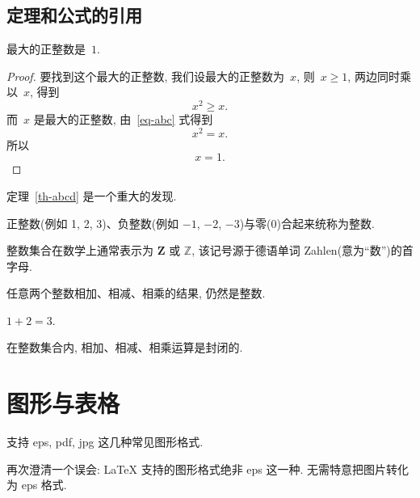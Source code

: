 \documentclass[forlib]{HDUMaster}   %
\begin{document}
\subsection{定理和公式的引用}

\begin{theorem}[谁发现的]\label{th-abcd}
最大的正整数是~$1$.
\end{theorem}

\begin{proof}
要找到这个最大的正整数, 我们设最大的正整数为~$x$, 则~$x \geqslant 1$, 两边同时乘以~$x$, 得到
\begin{equation}\label{eq-abc}
x^2 \geqslant x.
\end{equation}
而~$x$ 是最大的正整数, 由~\eqref{eq-abc} 式得到
\[
x^2 = x.
\]
所以
\begin{equation*}
x = 1.
\end{equation*}
\end{proof}

定理~\ref{th-abcd} 是一个重大的发现.

\begin{definition}[整数]
 正整数(例如 1, 2, 3)、负整数(例如 ${−1}$, $−2$, $−3$)与零(0)合起来统称为{\heiti 整数}.
\end{definition}

\begin{remark}
  整数集合在数学上通常表示为 $\mathbf{Z}$ 或 $\mathbb{Z}$, 该记号源于德语单词 Zahlen(意为``数'')的首字母.
\end{remark}

\begin{proposition}
任意两个整数相加、相减、相乘的结果, 仍然是整数.
\end{proposition}

\begin{example}
  $1+2=3$.
\end{example}

\begin{corollary}
   在整数集合内, 相加、相减、相乘运算是封闭的.
\end{corollary}

\section{图形与表格}

支持 eps, pdf, jpg 这几种常见图形格式.

再次澄清一个误会: \LaTeX{} 支持的图形格式绝非 eps 这一种. 无需特意把图片转化为 eps 格式.
\end{document}
